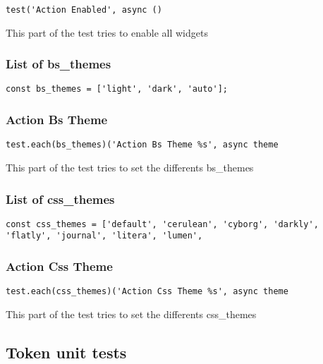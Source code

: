 \documentclass[a4paper]{article}
\begin{document}
\begin{lstlisting}
test('Action Enabled', async ()
\end{lstlisting}

This part of the test tries to enable all widgets

\hypertarget{toc272}{}
\subsubsection{List of bs\_themes}

\begin{lstlisting}
const bs_themes = ['light', 'dark', 'auto'];
\end{lstlisting}

\hypertarget{toc273}{}
\subsubsection{Action Bs Theme}

\begin{lstlisting}
test.each(bs_themes)('Action Bs Theme %s', async theme
\end{lstlisting}

This part of the test tries to set the differents bs\_themes

\hypertarget{toc274}{}
\subsubsection{List of css\_themes}

\begin{lstlisting}
const css_themes = ['default', 'cerulean', 'cyborg', 'darkly', 'flatly', 'journal', 'litera', 'lumen',
\end{lstlisting}

\hypertarget{toc275}{}
\subsubsection{Action Css Theme}

\begin{lstlisting}
test.each(css_themes)('Action Css Theme %s', async theme
\end{lstlisting}

This part of the test tries to set the differents css\_themes

\hypertarget{toc276}{}
\subsection{Token unit tests}
\end{document}
